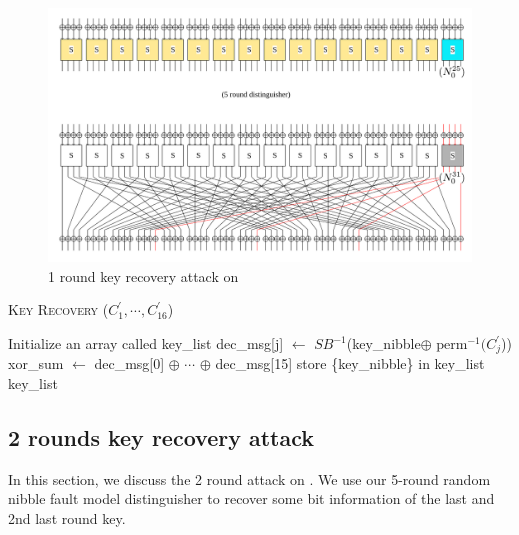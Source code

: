 \begin{figure}[!h]
	\centering
	\includegraphics[width=\linewidth]{fig/spn_code_libra_1_round_attack.pdf}
	\caption{1 round key recovery attack on \present}
	\label{fig:key_recovery_1_round_present}
\end{figure}




\begin{algorithm*}[htbp]
	\caption{\textsc{Key Recovery} ($C^\prime_1, \cdots, C^\prime_{16}$)}
	\label{alg:key_recovery_1_round_present}
	\begin{algorithmic}[1]	
		\State Initialize an array called key\_list	
			
		\State dec\_msg[j] $\gets$ $SB^{-1}$(key\_nibble$\oplus$ $\text{perm}^{-1}(C^\prime_j$))
		\EndFor
		xor\_sum $\gets$ dec\_msg[0] $\oplus$ $\cdots$ $\oplus$ dec\_msg[15]
			
		\State store \{key\_nibble\} in key\_list
		\EndIf
		\EndFor
		\Return key\_list			
	\end{algorithmic}
\end{algorithm*}




\subsection{2 rounds key recovery attack}
In this section, we discuss the 2 round attack on . We use our 5-round random nibble fault model distinguisher to recover some bit information of the last and 2nd last round key.

